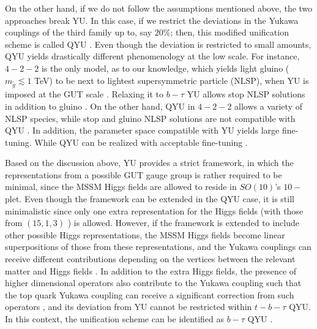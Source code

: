 \documentclass[12pt]{article}
\begin{document}
On the other hand, if we do not follow the assumptions mentioned above, the two approaches break YU. In this case, if we restrict the deviations in the Yukawa couplings of the third family up to, say  $20\%$; then, this modified unification scheme is called QYU \cite{Gomez:2002tj}. Even though the deviation is restricted to small amounts, QYU yields drastically different phenomenology at the low scale. For instance, $4-2-2$ is the only model, as to our knowledge, which yields light gluino ($m_{\tilde{g}}\lesssim 1$ TeV) to be next to lightest supersymmetric particle (NLSP), when YU is imposed at the GUT scale \cite{Gogoladze:2009ug}.  Relaxing it to $b-\tau$ YU allows stop NLSP solutions in addition to gluino \cite{Raza:2014upa}. On the other hand, QYU in $4-2-2$ allows a variety of NLSP species, while stop and gluino NLSP solutions are not compatible with QYU \cite{Dar:2011sj}. In addition, the parameter space compatible with YU yields large fine-tuning. While QYU can be realized with acceptable fine-tuning \cite{Dar:2011sj}.   

Based on the discussion above, YU provides a strict framework, in which the representations from a possible GUT gauge group is rather required to be minimal, since the MSSM Higgs fields are allowed to reside in $SO(10)$'s $10-$plet. Even though the framework can be extended in the QYU case, it is still minimalistic since only one extra representation for the Higgs fields (with those from $(15,1,3)$ \cite{Gomez:2002tj}) is allowed. However, if the framework is extended to include other possible Higgs representations, the MSSM Higgs fields become linear superpositions of those from these representations, and the  Yukawa couplings can receive different contributions depending on the vertices between the relevant matter and Higgs fields \cite{Bajc:2004xe}. In addition to the extra Higgs fields, the presence of higher dimensional operators also contribute to the Yukawa coupling such that the top quark Yukawa coupling can receive a significant correction from such operators \cite{Antusch:2013rxa}, and its deviation from YU cannot be restricted within $t-b-\tau$ QYU. In this context, the unification scheme can be identified as $b-\tau$ QYU \cite{Hebbar:2017olk}. 
\end{document}
